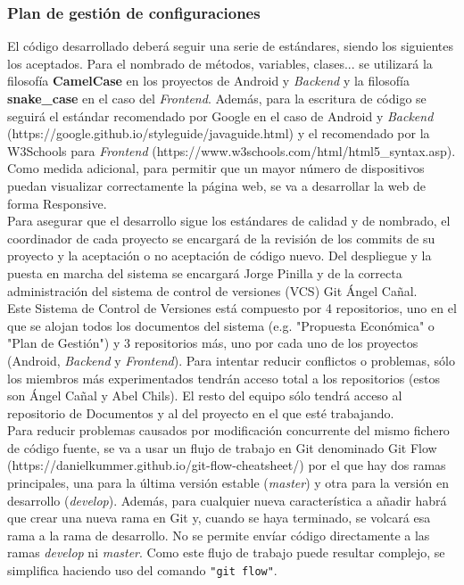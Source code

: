 \documentclass[12pt]{article}%
\begin{document}
\subsubsection{Plan de gesti\'on de configuraciones}

El c\'odigo desarrollado deber\'a seguir una serie de est\'andares, siendo los siguientes los aceptados. Para el nombrado de m\'etodos, variables, clases... se utilizar\'a la filosof\'ia \textbf{CamelCase} en los proyectos de Android y \textit{Backend} y la filosof\'ia \textbf{snake\_case} en el caso del \textit{Frontend}. Adem\'as, para la escritura de c\'odigo se seguir\'a el est\'andar recomendado por Google en el caso de Android y \textit{Backend} (https://google.github.io/styleguide/javaguide.html) y el recomendado por la W3Schools para \textit{Frontend} (https://www.w3schools.com/html/html5\_syntax.asp). Como medida adicional, para permitir que un mayor n\'umero de dispositivos puedan visualizar correctamente la p\'agina web, se va a desarrollar la web de forma Responsive.\\

Para asegurar que el desarrollo sigue los est\'andares de calidad y de nombrado, el coordinador de cada proyecto se encargar\'a de la revisi\'on de los commits de su proyecto y la aceptaci\'on o no aceptaci\'on de c\'odigo nuevo. Del despliegue y la puesta en marcha del sistema se encargar\'a Jorge Pinilla y de la correcta administraci\'on del sistema de control de versiones (VCS) Git \'Angel Ca\~nal.\\

Este Sistema de Control de Versiones est\'a compuesto por 4 repositorios, uno en el que se alojan todos los documentos del sistema (e.g. "Propuesta Econ\'omica" o "Plan de Gesti\'on") y 3 repositorios m\'as, uno por cada uno de los proyectos (Android, \textit{Backend} y \textit{Frontend}). Para intentar reducir conflictos o problemas, s\'olo los miembros m\'as experimentados tendr\'an acceso total a los repositorios (estos son \'Angel Ca\~nal y Abel Chils). El resto del equipo s\'olo tendr\'a acceso al repositorio de Documentos y al del proyecto en el que est\'e trabajando. \\

Para reducir problemas causados por modificaci\'on concurrente del mismo fichero de c\'odigo fuente, se va a usar un flujo de trabajo en Git denominado Git Flow (https://danielkummer.github.io/git-flow-cheatsheet/) por el que hay dos ramas principales, una para la \'ultima versi\'on estable (\textit{master}) y otra para la versi\'on en desarrollo (\textit{develop}). Adem\'as, para cualquier nueva caracter\'istica a a\~nadir habr\'a que crear una nueva rama en Git y, cuando se haya terminado, se volcar\'a esa rama a la rama de desarrollo. No se permite env\'iar c\'odigo directamente a las ramas \textit{develop} ni \textit{master}. Como este flujo de trabajo puede resultar complejo, se simplifica haciendo uso del comando \lstinline{"git flow"}.\\
\end{document}
